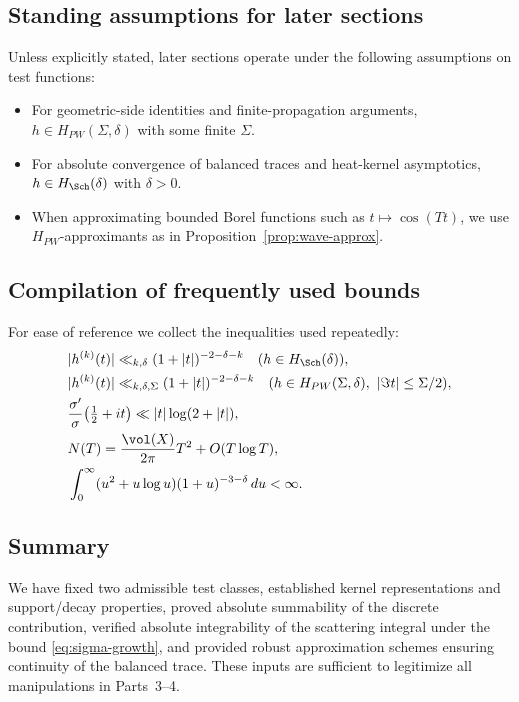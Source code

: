 \subsection{Standing assumptions for later sections}
\label{subsec:standing-assumptions}

Unless explicitly stated, later sections operate under the following assumptions on test functions:
\begin{itemize}
  \item For geometric-side identities and finite-propagation arguments, $h\in H_{PW}(\Sigma,\delta)$ with some finite $\Sigma$.
  \item For absolute convergence of balanced traces and heat-kernel asymptotics, $h\in H_{\Sch}(\delta)$ with $\delta>0$.
  \item When approximating bounded Borel functions such as $t\mapsto \cos(Tt)$, we use $H_{PW}$-approximants as in Proposition~\ref{prop:wave-approx}.
\end{itemize}

\subsection{Compilation of frequently used bounds}
\label{subsec:compiled-bounds}

For ease of reference we collect the inequalities used repeatedly:
\begin{align*}
  &|h^{(k)}(t)| \ll_{k,\delta} (1+|t|)^{-2-\delta-k} \quad (h\in H_{\Sch}(\delta)),\\
  &|h^{(k)}(t)| \ll_{k,\delta,\Sigma} (1+|t|)^{-2-\delta-k} \quad (h\in H_{PW}(\Sigma,\delta),\ |\Im t|\le \Sigma/2),\\
  &\frac{\sigma'}{\sigma}\!\left(\tfrac12+it\right) \ll |t|\log(2+|t|),\\
  &N(T)=\frac{\vol(X)}{2\pi}T^2 + O(T\log T),\\
  &\int_{0}^{\infty} (u^2+u\log u)(1+u)^{-3-\delta}\,du < \infty.
\end{align*}

\subsection{Summary}
\label{subsec:summary-part2}

\noindent
We have fixed two admissible test classes, established kernel representations and support/decay properties, proved absolute summability of the discrete contribution, verified absolute integrability of the scattering integral under the bound \eqref{eq:sigma-growth}, and provided robust approximation schemes ensuring continuity of the balanced trace. These inputs are sufficient to legitimize all manipulations in Parts~3–4.

